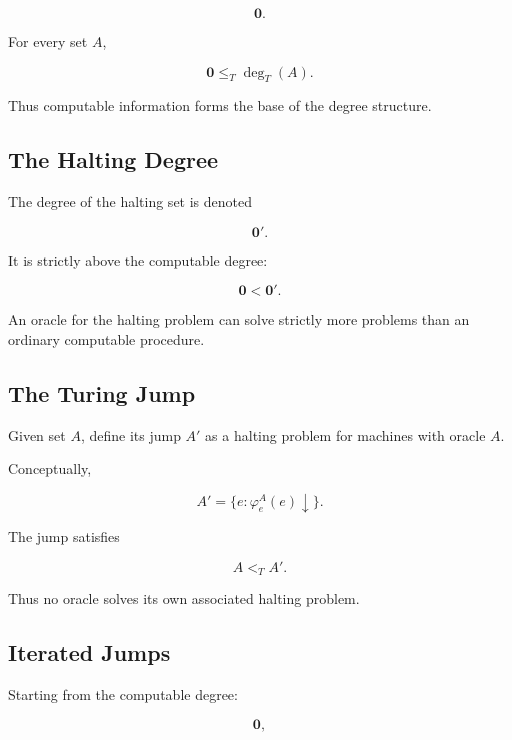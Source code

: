 \[
\boxed{
\mathbf{0}.
}
\]

For every set \(A\),

\[
\boxed{
\mathbf{0}
\leq_T
\deg_T(A).
}
\]

Thus computable information forms the base of the degree structure.

\subsection{The Halting Degree}
\label{subsec:recursion-halting-degree}

The degree of the halting set is denoted

\[
\boxed{
\mathbf{0}'.
}
\]

It is strictly above the computable degree:

\[
\boxed{
\mathbf{0}
<
\mathbf{0}'.
}
\]

An oracle for the halting problem can solve strictly more problems than an
ordinary computable procedure.

\subsection{The Turing Jump}
\label{subsec:recursion-turing-jump}

Given set \(A\), define its jump \(A'\) as a halting problem for machines
with oracle \(A\).

Conceptually,

\[
\boxed{
A'
=
\{
e:
\varphi_e^A(e)\downarrow
\}.
}
\]

The jump satisfies

\[
\boxed{
A<_TA'.
}
\]

Thus no oracle solves its own associated halting problem.

\subsection{Iterated Jumps}
\label{subsec:iterated-turing-jumps}

Starting from the computable degree:

\[
\boxed{
\mathbf{0},
}
\]

